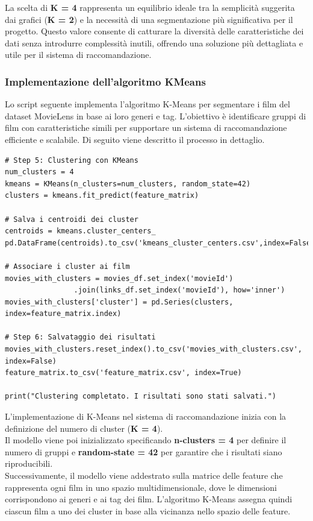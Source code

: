 \documentclass[a4paper,12pt]{article}
\begin{document}
La scelta di \textbf{K = 4} rappresenta un equilibrio ideale tra la semplicità suggerita dai grafici (\textbf{K = 2}) e la necessità di una segmentazione più significativa per il progetto. Questo valore consente di catturare la diversità delle caratteristiche dei dati senza introdurre complessità inutili, offrendo una soluzione più dettagliata e utile per il sistema di raccomandazione.
\newpage
\subsubsection{Implementazione dell'algoritmo KMeans}
Lo script seguente implementa l'algoritmo K-Means per segmentare i film del dataset MovieLens in base ai loro generi e tag.
L'obiettivo è identificare gruppi di film con caratteristiche simili per supportare un sistema di raccomandazione efficiente e scalabile. Di seguito viene descritto il processo in dettaglio.
\begin{center}
\begin{verbatim}
# Step 5: Clustering con KMeans
num_clusters = 4
kmeans = KMeans(n_clusters=num_clusters, random_state=42)
clusters = kmeans.fit_predict(feature_matrix)

# Salva i centroidi dei cluster
centroids = kmeans.cluster_centers_
pd.DataFrame(centroids).to_csv('kmeans_cluster_centers.csv',index=False,header=False)

# Associare i cluster ai film
movies_with_clusters = movies_df.set_index('movieId')
				.join(links_df.set_index('movieId'), how='inner')
movies_with_clusters['cluster'] = pd.Series(clusters, index=feature_matrix.index)

# Step 6: Salvataggio dei risultati
movies_with_clusters.reset_index().to_csv('movies_with_clusters.csv', index=False)
feature_matrix.to_csv('feature_matrix.csv', index=True)

print("Clustering completato. I risultati sono stati salvati.")
\end{verbatim}
\end{center}
L'implementazione di K-Means nel sistema di raccomandazione inizia con la definizione del numero di cluster (\textbf{K = 4}). \\Il modello viene poi inizializzato specificando \textbf{n-clusters = 4 }per definire il numero di gruppi e \textbf{random-state = 42 }per garantire che i risultati siano riproducibili.\\
Successivamente, il modello viene addestrato sulla matrice delle feature che rappresenta ogni film in uno spazio multidimensionale, dove le dimensioni corrispondono ai generi e ai tag dei film. L'algoritmo K-Means assegna quindi ciascun film a uno dei cluster in base alla vicinanza nello spazio delle feature.\\
\end{document}
